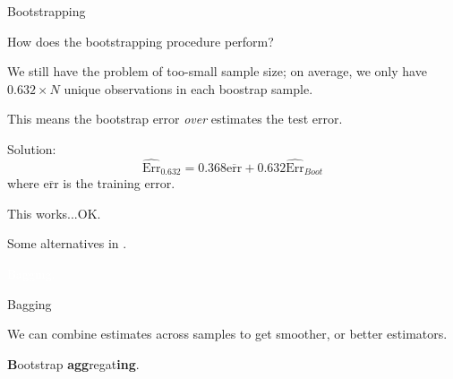 \documentclass[xcolor={table}, handout]{beamer}
\begin{document}



\begin{frame}{Bootstrapping}

\begin{wideitemize}
\item How does the bootstrapping procedure perform?\pause
\item We still have the problem of too-small sample size\pause; on average, we only have $0.632 \times N$ unique observations in each boostrap sample. \pause
\item This means the bootstrap error \textit{over} estimates the test error. 
\item Solution: 
\[
\widehat{\textrm{Err}}_{0.632} = 0.368 \overline{\textrm{err}} + 0.632 \widehat{\textrm{Err}}_{Boot}  
\]
where $\overline{\textrm{err}}$ is the training error. \pause
\item This works...OK. \pause
\item Some alternatives in \cite{hastie2009elements}. 
\end{wideitemize}

\end{frame}




\begin{transitionframe}
\centering

\LARGE \textcolor{white}{Bagging.}

\end{transitionframe}
\begin{frame}{Bagging}

\begin{wideitemize}
\item We can combine estimates across samples to get smoother, or better estimators. \pause
\item \textcolor{Contrast6l}{\textbf{B}}ootstrap \textcolor{Contrast6l}{\textbf{agg}}regat\textcolor{Contrast6l}{\textbf{ing}}.
\end{wideitemize}

\end{frame}
\end{document}
